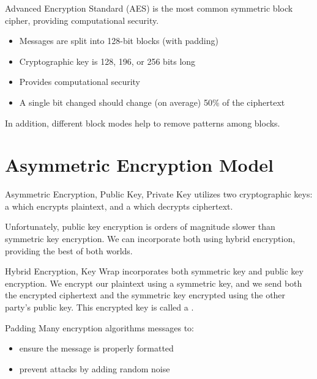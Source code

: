 \documentclass[12pt]{report}
\begin{document}
\begin{dfnbox}{Advanced Encryption Standard (AES)}{}
     is the most common symmetric block cipher, providing computational security.
    \begin{itemize}[noitemsep]
        \item Messages are split into 128-bit blocks (with padding)
        \item Cryptographic key is 128, 196, or 256 bits long
        \item Provides computational security
        \item A single bit changed should change (on average) 50\% of the ciphertext
    \end{itemize}
    In addition, different block modes help to remove patterns among blocks.
\end{dfnbox}

\section{Asymmetric Encryption Model}

\begin{dfnbox}{Asymmetric Encryption, Public Key, Private Key}{}
     utilizes two cryptographic keys: a  which encrypts plaintext, and a  which decrypts ciphertext.
\end{dfnbox}

Unfortunately, public key encryption is orders of magnitude slower than symmetric key encryption. We can incorporate both using hybrid encryption, providing the best of both worlds.

\begin{dfnbox}{Hybrid Encryption, Key Wrap}{}
     incorporates both symmetric key and public key encryption. We encrypt our plaintext using a symmetric key, and we send both the encrypted ciphertext and the symmetric key encrypted using the other party's public key. This encrypted key is called a .
\end{dfnbox}

\begin{dfnbox}{Padding}{}
    Many encryption algorithms  messages to:
    \begin{itemize}[noitemsep]
        \item ensure the message is properly formatted
        \item prevent attacks by adding random noise
    \end{itemize}
\end{dfnbox}
\end{document}
